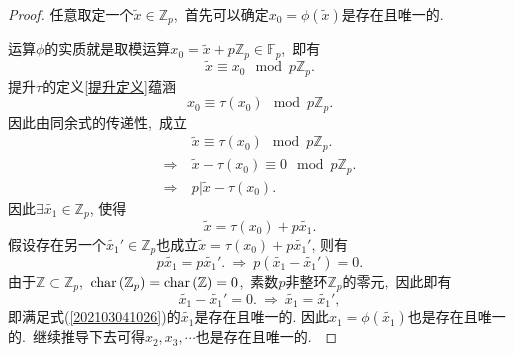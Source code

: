 \documentclass[UTF8, twoside]{ctexart}
\theoremstyle{nonumberplain}
\newtheorem{proof}{\heiti 证明}  %
\theoremstyle{nonumberplain}
\theoremstyle{plain}
\begin{document}
	\begin{proof}
		任意取定一个$\widetilde{x}\in {{\mathbb{Z}}_{p}}$,\ 首先可以确定${{x}_{0}}=\phi \left( \widetilde{x} \right)$是存在且唯一的.\ 
		
		运算$\phi $的实质就是取模运算${{x}_{0}}=\widetilde{x}+p{{\mathbb{Z}}_{p}}\in {{\mathbb{F}}_{p}}$,\ 即有
		\[
			\widetilde{x}\equiv {{x}_{0}}\ \bmod p{{\mathbb{Z}}_{p}}.
		\]
		提升$\tau $的定义\ref{提升定义}蕴涵
		\[
			{{x}_{0}}\equiv \tau \left( {{x}_{0}} \right)\ \bmod p{{\mathbb{Z}}_{p}}.
		\]
		因此由同余式的传递性,\ 成立
		\begin{subequations} \label{202103060909}
			\begin{align}
			& \widetilde{x}\equiv \tau \left( {{x}_{0}} \right)\ \bmod p{{\mathbb{Z}}_{p}}. 
			\label{202103060909_1}
			\\ 
			\Longrightarrow\ & \widetilde{x}-\tau \left( {{x}_{0}} \right)\equiv 0\ \bmod p{{\mathbb{Z}}_{p}}. \\ 
			\Longrightarrow\ & \left. p \right|\widetilde{x}-\tau \left( {{x}_{0}} \right). 
			\end{align}
		\end{subequations}
		因此$\exists \widetilde{{{x}_{1}}}\in {{\mathbb{Z}}_{p}}$, 使得
		\begin{equation} \label{202103041026}
		\widetilde{x}=\tau \left( {{x}_{0}} \right)+p\widetilde{{{x}_{1}}}.
		\end{equation}
		假设存在另一个$\widetilde{{{x}_{1}}}'\in {{\mathbb{Z}}_{p}}$也成立$\widetilde{x}=\tau \left( {{x}_{0}} \right)+p\widetilde{{{x}_{1}}}'$, 则有
		\[
			p\widetilde{{{x}_{1}}}=p\widetilde{{{x}_{1}}}'.\ \Longrightarrow \ p\left( \widetilde{{{x}_{1}}}-\widetilde{{{x}_{1}}}' \right)=0.
		\]
		由于$\mathbb{Z}\subset {{\mathbb{Z}}_{p}}$,\ $\textup{char}\left( {{\mathbb{Z}}_{p}} \right)=\textup{char}\left( \mathbb{Z} \right)=0$,\ 素数$p$非整环$\mathbb{Z}_p$的零元,\ 因此即有
		\[\widetilde{{{x}_{1}}}-\widetilde{{{x}_{1}}}'=0.\ \Longrightarrow \ 
		\widetilde{{{x}_{1}}}=\widetilde{{{x}_{1}}}',\]
		即满足式(\ref{202103041026})的$\widetilde{{{x}_{1}}}$是存在且唯一的.
		因此${{x}_{1}}=\phi \left( \widetilde{{{x}_{1}}} \right)$也是存在且唯一的.\ 继续推导下去可得${{x}_{2}},{{x}_{3}},\cdots $也是存在且唯一的.\ 
	\end{proof}
	\vskip 0.5cm
	
\end{document}
